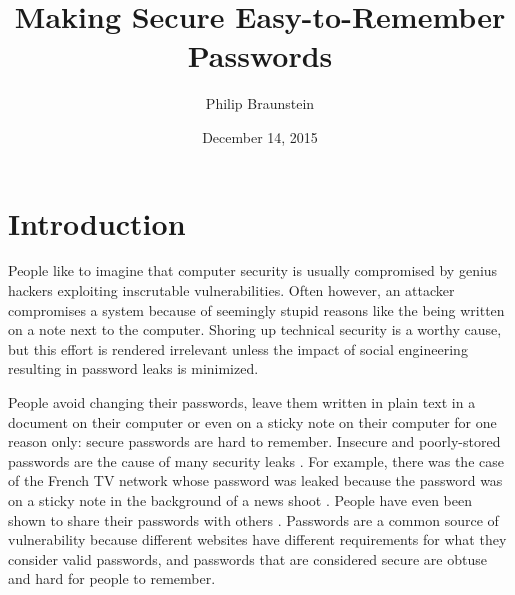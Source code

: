 \documentclass{article}
\title{Making Secure Easy-to-Remember Passwords}
\author{Philip Braunstein}
\date{December 14, 2015}
\begin{document}
\maketitle
{}

\section*{Introduction}
People like to imagine that computer security is usually compromised by genius hackers exploiting inscrutable vulnerabilities. Often however, an attacker compromises a system because of seemingly stupid reasons like the being written on a note next to the computer. Shoring up technical security is a worthy cause, but this effort is rendered irrelevant unless the impact of social engineering resulting in password leaks is minimized. 

People avoid changing their passwords, leave them written in plain text in a document on their computer or even on a sticky note on their computer for one reason only: secure passwords are hard to remember. Insecure and poorly-stored passwords are the cause of many security leaks \cite{stupid}. For example, there was the case of the French TV network whose password was leaked because the password was on a sticky note in the background of a news shoot \cite{tv}. People have even been shown to share their passwords with others \cite{share}. Passwords are a common source of vulnerability because different websites have different requirements for what they consider valid passwords, and passwords that are considered secure are obtuse and hard for people to remember.
\end{document}
